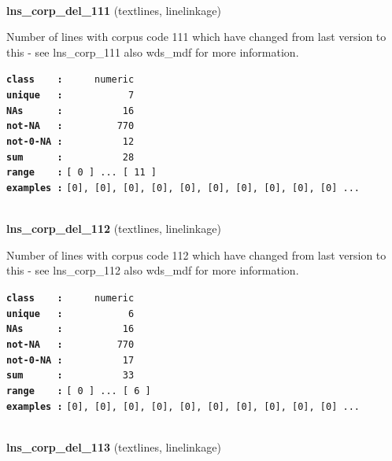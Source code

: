 \documentclass[]{article}
\begin{document}
~

\textbf{lns\_corp\_del\_111} (textlines, linelinkage)

Number of lines with corpus code 111 which have changed from last
version to this - see lns\_corp\_111 also wds\_mdf for more information.

\textbf{\texttt{class\ \ \ \ :}} \texttt{~~~~~numeric}\\
\textbf{\texttt{unique\ \ \ :}} \texttt{~~~~~~~~~~~7}\\
\textbf{\texttt{NAs\ \ \ \ \ \ :}} \texttt{~~~~~~~~~~16}\\
\textbf{\texttt{not-NA\ \ \ :}} \texttt{~~~~~~~~~770}\\
\textbf{\texttt{not-0-NA\ :}} \texttt{~~~~~~~~~~12}\\
\textbf{\texttt{sum\ \ \ \ \ \ :}} \texttt{~~~~~~~~~~28}\\
\textbf{\texttt{range\ \ \ \ :}}
\texttt{{[}\ 0\ {]}\ ...\ {[}\ 11\ {]}}\\
\textbf{\texttt{examples\ :}}
\texttt{{[}0{]},\ {[}0{]},\ {[}0{]},\ {[}0{]},\ {[}0{]},\ {[}0{]},\ {[}0{]},\ {[}0{]},\ {[}0{]},\ {[}0{]}\ ...}\\

~

\textbf{lns\_corp\_del\_112} (textlines, linelinkage)

Number of lines with corpus code 112 which have changed from last
version to this - see lns\_corp\_112 also wds\_mdf for more information.

\textbf{\texttt{class\ \ \ \ :}} \texttt{~~~~~numeric}\\
\textbf{\texttt{unique\ \ \ :}} \texttt{~~~~~~~~~~~6}\\
\textbf{\texttt{NAs\ \ \ \ \ \ :}} \texttt{~~~~~~~~~~16}\\
\textbf{\texttt{not-NA\ \ \ :}} \texttt{~~~~~~~~~770}\\
\textbf{\texttt{not-0-NA\ :}} \texttt{~~~~~~~~~~17}\\
\textbf{\texttt{sum\ \ \ \ \ \ :}} \texttt{~~~~~~~~~~33}\\
\textbf{\texttt{range\ \ \ \ :}}
\texttt{{[}\ 0\ {]}\ ...\ {[}\ 6\ {]}}\\
\textbf{\texttt{examples\ :}}
\texttt{{[}0{]},\ {[}0{]},\ {[}0{]},\ {[}0{]},\ {[}0{]},\ {[}0{]},\ {[}0{]},\ {[}0{]},\ {[}0{]},\ {[}0{]}\ ...}\\

~

\textbf{lns\_corp\_del\_113} (textlines, linelinkage)
\end{document}
